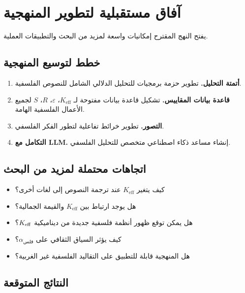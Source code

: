 \documentclass[11pt,a4paper]{article}
\newcommand{\eps}{\varepsilon}
\begin{document}
	\section{آفاق مستقبلية لتطوير المنهجية}
	\label{sec:future-directions}
	
	يفتح النهج المقترح إمكانيات واسعة لمزيد من البحث والتطبيقات العملية.
	
	\subsection{خطط لتوسيع المنهجية}
	
	\begin{enumerate}
		\item \textbf{أتمتة التحليل.} تطوير حزمة برمجيات للتحليل الدلالي الشامل للنصوص الفلسفية.
		\item \textbf{قاعدة بيانات المقاييس.} تشكيل قاعدة بيانات مفتوحة لـ \(K_{\mathrm{eff}}\)، \(\eps\)، \(R\)، \(S\) لجميع الأعمال الفلسفية الهامة.
		\item \textbf{التصور.} تطوير خرائط تفاعلية لتطور الفكر الفلسفي.
		\item \textbf{التكامل مع LLM.} إنشاء مساعد ذكاء اصطناعي متخصص للتحليل الفلسفي.
	\end{enumerate}
	
	\subsection{اتجاهات محتملة لمزيد من البحث}
	
	\begin{itemize}
		\item كيف يتغير \(K_{\mathrm{eff}}\) عند ترجمة النصوص إلى لغات أخرى؟
		\item هل يوجد ارتباط بين \(K_{\mathrm{eff}}\) والقيمة الجمالية؟
		\item هل يمكن توقع ظهور أنظمة فلسفية جديدة من ديناميكية \(\Keff\)؟
		\item كيف يؤثر السياق الثقافي على \(\alpha_{\text{فلس}}\)؟
		\item هل المنهجية قابلة للتطبيق على التقاليد الفلسفية غير الغربية؟
	\end{itemize}
	
	\subsection{النتائج المتوقعة}
	
\end{document}
